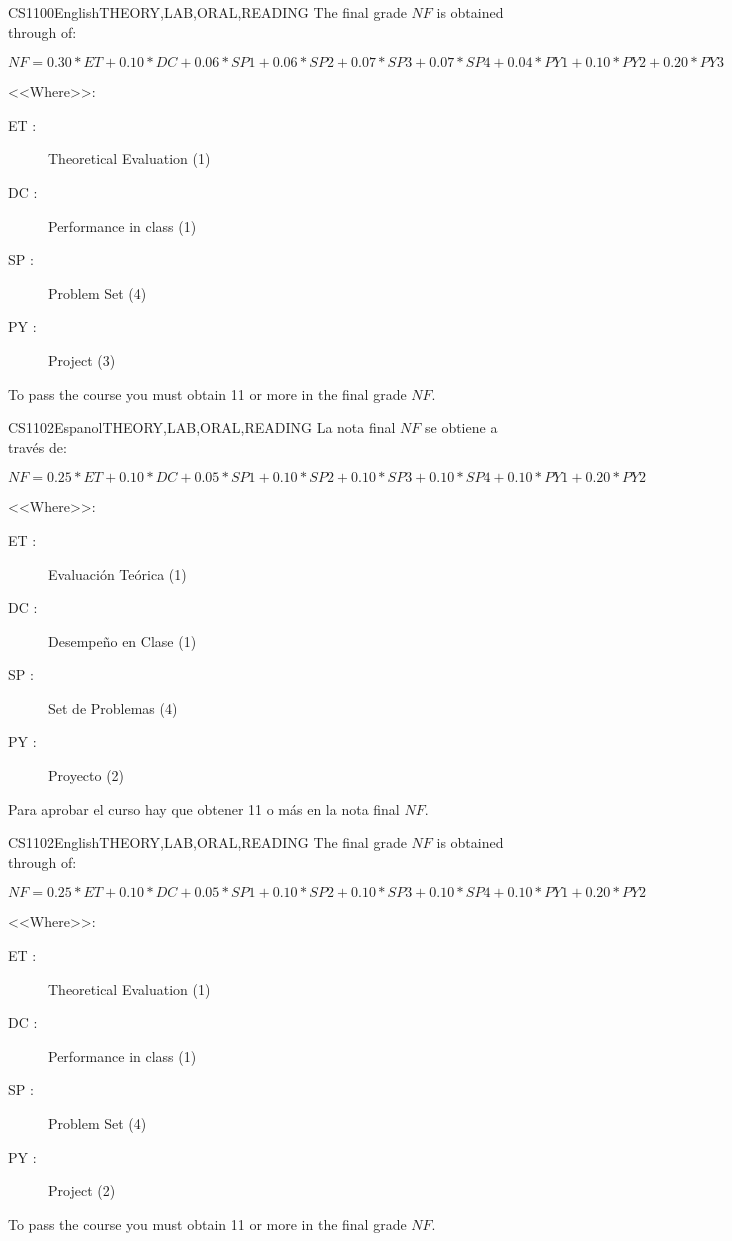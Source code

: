 \begin{evaluation}{CS1100}{English}{THEORY,LAB,ORAL,READING}
The final grade $NF$ is obtained through of:

$ NF = 0.30*ET + 0.10*DC + 0.06*SP1 + 0.06*SP2 + 0.07*SP3 + 0.07*SP4 +0.04*PY1
 + 0.10*PY2 + 0.20*PY3 $

<<Where>>:
\begin{description}
  \item[ET :] Theoretical Evaluation (1)
  \item[DC :] Performance in class (1)
  \item[SP :] Problem Set (4)
  \item[PY :] Project (3)
\end{description}

	To pass the course you must obtain 11 or more in the final grade $NF$.
\end{evaluation}


\begin{evaluation}{CS1102}{Espanol}{THEORY,LAB,ORAL,READING}
La nota final $NF$ se obtiene a través de:

  $ NF = 0.25*ET + 0.10*DC + 0.05*SP1 + 0.10*SP2 + 0.10*SP3 + 0.10*SP4 +0.10*PY1
   + 0.20*PY2 $

<<Where>>:
  \begin{description}
		\item[ET :] Evaluación Teórica (1)
		\item[DC :] Desempeño en Clase (1)
    \item[SP :] Set de Problemas (4)
    \item[PY :] Proyecto (2)
	\end{description}

	Para aprobar el curso hay que obtener 11 o más en la nota final $NF$.
\end{evaluation}

\begin{evaluation}{CS1102}{English}{THEORY,LAB,ORAL,READING}
The final grade $NF$ is obtained through of:

$ NF = 0.25*ET + 0.10*DC + 0.05*SP1 + 0.10*SP2 + 0.10*SP3 + 0.10*SP4 +0.10*PY1
 + 0.20*PY2 $

<<Where>>:
\begin{description}
  \item[ET :] Theoretical Evaluation (1)
  \item[DC :] Performance in class (1)
  \item[SP :] Problem Set (4)
  \item[PY :] Project (2)
\end{description}

	To pass the course you must obtain 11 or more in the final grade $NF$.
\end{evaluation}


